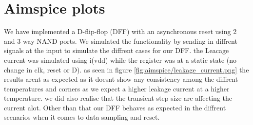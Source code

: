 \section{Aimspice plots} 
We have implemented a D-flip-flop (DFF) with an asynchronous reset using 2 and 3 way NAND ports. We simulated the functionality by sending in diffrent signals at the input to simulate the diffrent cases for our DFF. the Leacage current was simulated using i(vdd) while the register was at a static state (no change in clk, reset or D). as seen in figure \ref{fig:aimspice/leakage_current.png} the results arent as expected as it doesnt show any consistency among the diffrent temperatures and corners as we expect a higher leakage current at a higher temperature. we did also realise that the transient step size are affecting the current alot. Other than that our DFF behaves as expected in the diffrent scenarios when it comes to data sampling and reset.


